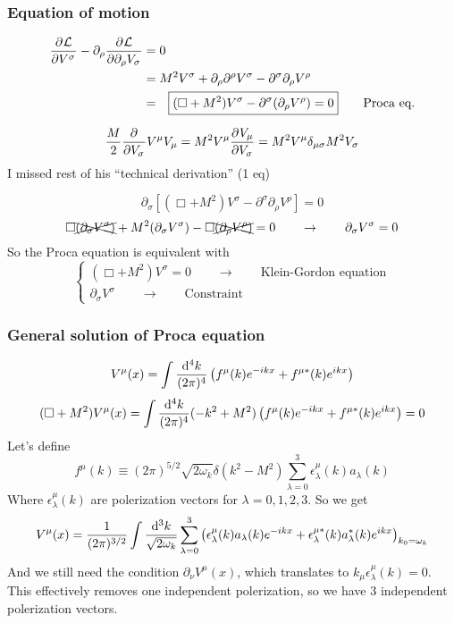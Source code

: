  \subsubsection{Equation of motion}
\begin{align*}
\pd{\mathcal{L}}{V^\sigma}-\partial_\rho \pd{\mathcal{L}}{\partial_\rho V_\sigma} &= 0 \\
 &= M^2V^\sigma + \partial_\rho\partial^\rho V^\sigma - \partial^\sigma\partial_\rho V^\rho \\
 &= \Aboxed{(\Box+M^2)V^\sigma - \partial^\sigma(\partial_\rho V^\rho) = 0} \qquad \text{Proca eq.}
 \end{align*}
\begin{params}
 \[ \frac{M}{2} \frac{\partial{^{}}}{\partial{{V_\sigma}^{}}} V^\mu V_\mu = M^2 V^\mu  \frac{\partial{^{}}V_\mu}{\partial{{V_\sigma}^{}}} = M^2V^\mu\delta_{\mu\sigma}M^2V_\sigma \]
 I missed rest of his ``technical derivation'' (1 eq)
\end{params}
\[ \partial_\sigma \left[(\Box+M^2)V^\sigma - \partial^\sigma\partial_\rho V^\rho\right] = 0 \]
\[ \Box\xcancel{(\partial_\sigma V^\sigma)} + M^2(\partial_\sigma V^\sigma) - \Box\xcancel{(\partial_\rho V^\rho)} = 0 \qquad \to \qquad \partial_\sigma V^\sigma = 0 \]
So the Proca equation is equivalent with
\[ \begin{cases}
(\Box + M^2)V^\sigma = 0 \qquad \to \qquad \text{Klein-Gordon equation} \\
\partial_\sigma V^\sigma \qquad \to \qquad \text{Constraint}
\end{cases} \]
\subsubsection{General solution of Proca equation}
\[ V^\mu(x) = \int \frac{\operatorname{d \!}{^4k}}{(2\pi)^4}\left(f^\mu(k)e^{-ikx}+f^{\mu*}(k)e^{ikx}\right) \]
\[ (\Box+M^2)V^\mu(x) = \int \frac{\operatorname{d \!}{^4k}}{(2\pi)^4}(-k^2+M^2)\left(f^\mu(k)e^{-ikx}+f^{\mu*}(k)e^{ikx}\right) = 0 \]
Let's define
\[ f^\mu(k) \equiv (2\pi)^{5/2}\sqrt{2\omega_k}\delta(k^2-M^2)\sum^3_{\lambda=0}\epsilon^\mu_\lambda(k)a_\lambda(k) \]
Where $\epsilon^\mu_\lambda(k)$ are polerization vectors for $\lambda = 0,1,2,3$. So we get
\[ V^\mu(x) = \frac{1}{(2\pi)^{3/2}}\int \frac{\operatorname{d \!}{^3k}}{\sqrt{2\omega_k}}\sum^3_{\lambda=0}\left(\epsilon^\mu_\lambda(k)a_\lambda(k)e^{-ikx}+\epsilon^{\mu*}_\lambda(k)a_\lambda^*(k)e^{ikx}\right)_{k_0=\omega_k} \]
And we still need the condition $\partial_\nu V^\mu(x)$, which translates to $k_\mu\epsilon^\mu_\lambda(k)=0$. This effectively removes one independent polerization, so we have 3 independent polerization vectors.

